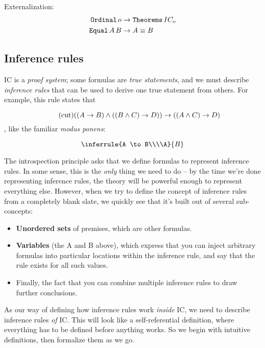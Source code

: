 \documentclass{article}
\begin{document}
  Externalization:
  \begin{align*}
    \operatorname{\texttt{Ordinal}} o &\to \operatorname{\texttt{Theorems}} IC_o\\
    \operatorname{\texttt{Equal}} A\,B &\to A \equiv B\\
  \end{align*}
  
  
  \subsection{Inference rules}
  
  IC is a \emph{proof system}; some formulas are \emph{true statements}, and we must describe \emph{inference rules} that can be used to derive one true statement from others. For example, this rule states that
  
  \begin{equation*}
    \tag{cut}
    ((A \to B) \wedge ((B \wedge C) \to D)) \to ((A \wedge C) \to D)\\
  \end{equation*}
  , like the familiar \emph{modus ponens}:
  
  \begin{equation*}
    \inferrule{A \to B\\\\A}{B}
  \end{equation*}
  
  The introspection principle asks that we define formulas to represent inference rules.
  In some sense, this is the \emph{only} thing we need to do – by the time we're done representing inference rules, the theory will be powerful enough to represent everything else.
  However, when we try to define the concept of inference rules from a completely blank slate, we quickly see that it's built out of several sub-concepts:
  \begin{itemize}
    \item \textbf{Unordered sets} of premises, which are other formulas.
    \item \textbf{Variables} (the A and B above), which express that you can inject arbitrary formulas into particular locations within the inference rule, and say that the rule exists for all such values.
    \item Finally, the fact that you can combine multiple inference rules to draw further conclusions.
  \end{itemize}
  
  As our way of defining how inference rules work \emph{inside} IC, we need to describe inference rules \emph{of} IC. This will look like a self-referential definition, where everything has to be defined before anything works. So we begin with intuitive definitions, then formalize them as we go.
    
\end{document}
